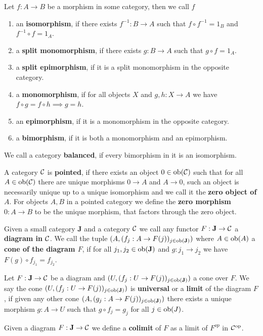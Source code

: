 \begin{definition}
    Let $f: A\to B$ be a morphism in some category, then we call $f$
    \begin{enumerate}
        \item an \textbf{isomorphism}, if there exists $f^{-1} : B\to A$ such that $f\circ f^{-1} = 1_B$ and $f^{-1}\circ f = 1_A$.
        \item a \textbf{split monomorphism}, if there exists $g: B\to A$ such that $g\circ f= 1_A$.
        \item a \textbf{split epimorphism}, if it is a split monomorphism in the opposite category.
        \item a \textbf{monomorphism}, if for all objects $X$ and $g,h: X \to A$ we have $f\circ g =f\circ h \implies g=h$.
        \item an \textbf{epimorphism}, if it is a monomorphism in the opposite category.
        \item a \textbf{bimorphism}, if it is both a monomorphism and an epimorphism.
    \end{enumerate}
    We call a category \textbf{balanced}, if every bimorphism in it is an isomorphism.
\end{definition}
\begin{definition}
    A category $\mathcal{C}$ is \textbf{pointed}, if there exists an object $0\in\text{ob}(\mathcal{C})$ such that for all $A\in\text{ob}(\mathcal{C})$ there are 
    unique morphisms $0 \to A$ and $A \to 0$, such an object is necessarily unique up to a unique isomorphism and we call it the \textbf{zero object of $A$}. For objects $A,B$ in a 
    pointed category we define the \textbf{zero morphism} $0: A\to B$ to be the unique morphism, that factors through the zero object.
\end{definition}
\begin{definition}
    Given a small category $\mathbf{J}$ and a category $\mathcal{C}$ we call any functor $F:\mathbf{J}\to\mathcal{C}$ a \textbf{diagram in $\mathcal{C}$}. We call the tuple
    $(A,(f_j : A \to F(j))_{j\in\mathbf{\text{ob}(J)}})$ where $A\in\text{ob}(A)$ a \textbf{cone of the diagram $F$}, if for all 
    $j_1,j_2\in\text{ob}(\mathbf{J})$ and $g: j_1 \to j_2$ we have $F(g)\circ f_{j_1} = f_{j_2}$.\par
    Let $F: \mathbf{J} \to\mathcal{C}$ be a diagram and $(U, (f_j : U \to F(j))_{j\in\mathbf{\text{ob}(J)}})$ a cone over $F$. We say the cone $(U, (f_j : U \to F(j))_{j\in\mathbf{\text{ob}(J)}})$
    is \textbf{universal} or a \textbf{limit} of the diagram $F$, if given any other cone $(A,(g_j: A \to F(j))_{j\in\mathbf{\text{ob}(J)}})$ 
    there exists a unique morphism $g: A \to U$ such that $g\circ f_j = g_j$ for all $j\in\text{ob}(J)$.\par
    Given a diagram $F: \mathbf{J}\to\mathcal{C}$ we define a \textbf{colimit} of $F$ as a limit of $F^{op}$ in $\mathcal{C}^{\text{op}}$.
\end{definition}
